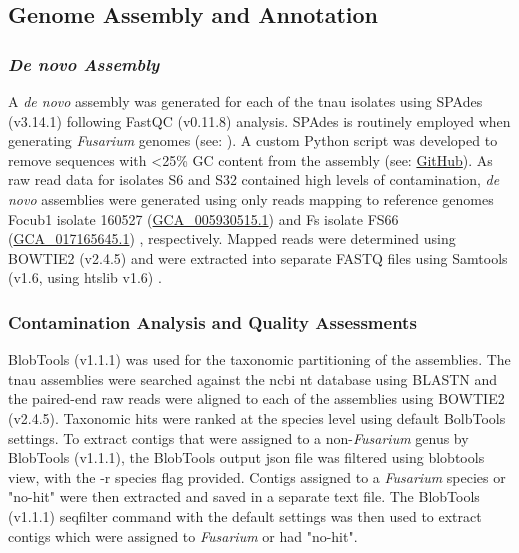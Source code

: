 \subsection{Genome Assembly and Annotation}

\subsubsection{\textit{De novo Assembly}}
A \textit{de novo} assembly was generated for each of the \ac{tnau} isolates using SPAdes (v3.14.1) \parencite{Prjibelski2020} following FastQC (v0.11.8) analysis. SPAdes is routinely employed when generating \textit{Fusarium} genomes
(see: \textcite{Armitage2018, Hudson2020, Tanaka2022}). A custom Python script was developed to remove sequences with <25\% GC content from the assembly (see: \href{https://github.com/JamiePike/NewTools-Project/blob/master/bin/gcTrimmer.py}{GitHub}). As raw read data for isolates S6 and S32 contained high levels of contamination, \textit{de novo} assemblies were generated using only reads mapping to reference genomes \ac{Focub1} isolate 160527 (\href{https://www.ncbi.nlm.nih.gov/datasets/genome/GCA_005930515.1/}{GCA\_005930515.1}) \parencite{Asai2019} and \ac{Fs} isolate FS66 (\href{https://www.ncbi.nlm.nih.gov/datasets/genome/GCA_017165645.1/}{GCA\_017165645.1}) \parencite{Cui2021}, respectively. Mapped reads were determined using BOWTIE2 (v2.4.5) and were extracted into separate FASTQ files using Samtools (v1.6, using htslib v1.6) \parencite{Danecek2021}. 

\subsubsection{Contamination Analysis and Quality Assessments}
BlobTools (v1.1.1) \parencite{Laetsch2017} was used for the taxonomic partitioning of the assemblies. The \ac{tnau} assemblies were searched against the \ac{ncbi} nt database using BLASTN and the paired-end raw reads were aligned to each of the assemblies using BOWTIE2 (v2.4.5). Taxonomic hits were ranked at the species level using default BolbTools settings. To extract contigs that were assigned to a non-\textit{Fusarium} genus by BlobTools (v1.1.1), the BlobTools output json file was filtered using blobtools view, with the -r species flag provided. Contigs assigned to a \textit{Fusarium} species or "no-hit" were then extracted and saved in a separate text file. The BlobTools (v1.1.1) seqfilter command with the default settings was then used to extract contigs which were assigned to \textit{Fusarium} or had "no-hit".

